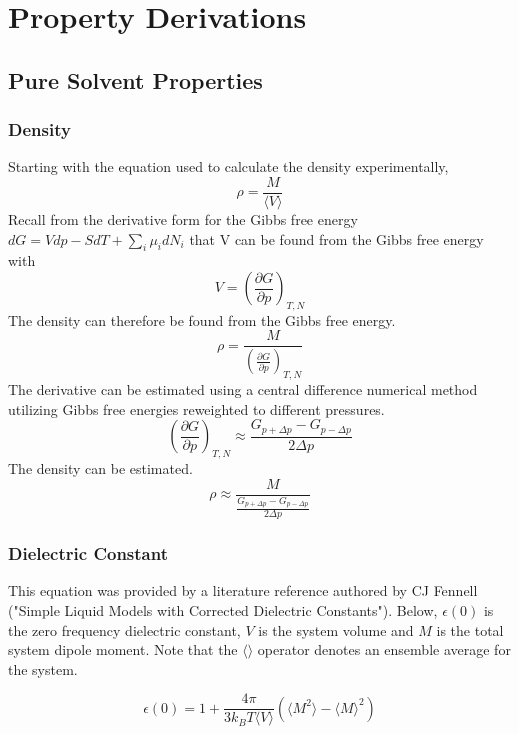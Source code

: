 \documentclass[a4paper,12pt]{article}
\begin{document}
\appendix
\section{Property Derivations}
\subsection{Pure Solvent Properties}
\subsubsection{Density}
Starting with the equation used to calculate the density experimentally, 
\begin{equation} \rho = \frac{M}{\langle V \rangle} \end{equation}
Recall from the derivative form for the Gibbs free energy $dG = Vdp -SdT + \sum_i \mu_i dN_i$ that V can be found from the Gibbs free energy with
\begin{equation} V = \left( \frac{\partial G}{\partial p} \right)_{T,N} \end{equation}
The density can therefore be found from the Gibbs free energy.
\begin{equation} \rho = \frac{M}{ \left( \frac{\partial G}{\partial p} \right)_{T,N}} \end{equation}
The derivative can be estimated using a central difference numerical method utilizing Gibbs free energies reweighted to different pressures.
\begin{equation} \left( \frac{\partial G}{\partial p} \right)_{T,N} \approx \frac{G_{p + \Delta p} - G_{p-\Delta p}}{2\Delta p} \end{equation}
The density can be estimated.
\begin{equation} \rho \approx \frac{M}{\frac{G_{p + \Delta p} - G_{p-\Delta p}}{2\Delta p}} \end{equation}


\subsubsection{Dielectric Constant}
This equation was provided by a literature reference authored by CJ Fennell ("Simple Liquid Models with Corrected Dielectric Constants"). Below, $\epsilon(0)$ is the zero frequency dielectric constant, $V$ is the system volume and $M$ is the total system dipole moment. Note that the $\langle \rangle$ operator denotes an ensemble average for the system.

\begin{equation} \epsilon(0) = 1 + \frac{4 \pi}{3 k_B T \langle V \rangle}(\langle M^2 \rangle - \langle M \rangle^2) \end{equation}
\end{document}
